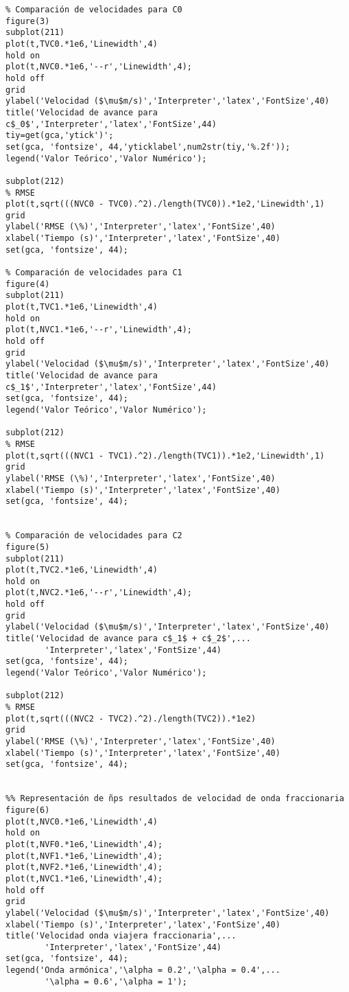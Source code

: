 \begin{lstlisting}[]
%% Representación de los resultados de velocidad
% Comparación de velocidades para C0
figure(3)
subplot(211)
plot(t,TVC0.*1e6,'Linewidth',4)
hold on
plot(t,NVC0.*1e6,'--r','Linewidth',4);
hold off
grid
ylabel('Velocidad ($\mu$m/s)','Interpreter','latex','FontSize',40)
title('Velocidad de avance para c$_0$','Interpreter','latex','FontSize',44)
tiy=get(gca,'ytick')';
set(gca, 'fontsize', 44,'yticklabel',num2str(tiy,'%.2f'));
legend('Valor Teórico','Valor Numérico');

subplot(212)
% RMSE
plot(t,sqrt(((NVC0 - TVC0).^2)./length(TVC0)).*1e2,'Linewidth',1)
grid
ylabel('RMSE (\%)','Interpreter','latex','FontSize',40)
xlabel('Tiempo (s)','Interpreter','latex','FontSize',40)
set(gca, 'fontsize', 44);

% Comparación de velocidades para C1
figure(4)
subplot(211)
plot(t,TVC1.*1e6,'Linewidth',4)
hold on
plot(t,NVC1.*1e6,'--r','Linewidth',4);
hold off
grid
ylabel('Velocidad ($\mu$m/s)','Interpreter','latex','FontSize',40)
title('Velocidad de avance para c$_1$','Interpreter','latex','FontSize',44)
set(gca, 'fontsize', 44);
legend('Valor Teórico','Valor Numérico');

subplot(212)
% RMSE
plot(t,sqrt(((NVC1 - TVC1).^2)./length(TVC1)).*1e2,'Linewidth',1)
grid
ylabel('RMSE (\%)','Interpreter','latex','FontSize',40)
xlabel('Tiempo (s)','Interpreter','latex','FontSize',40)
set(gca, 'fontsize', 44);


% Comparación de velocidades para C2
figure(5)
subplot(211)
plot(t,TVC2.*1e6,'Linewidth',4)
hold on
plot(t,NVC2.*1e6,'--r','Linewidth',4);
hold off
grid
ylabel('Velocidad ($\mu$m/s)','Interpreter','latex','FontSize',40)
title('Velocidad de avance para c$_1$ + c$_2$',...
        'Interpreter','latex','FontSize',44)
set(gca, 'fontsize', 44);
legend('Valor Teórico','Valor Numérico');

subplot(212)
% RMSE
plot(t,sqrt(((NVC2 - TVC2).^2)./length(TVC2)).*1e2)
grid
ylabel('RMSE (\%)','Interpreter','latex','FontSize',40)
xlabel('Tiempo (s)','Interpreter','latex','FontSize',40)
set(gca, 'fontsize', 44);


%% Representación de ñps resultados de velocidad de onda fraccionaria
figure(6)
plot(t,NVC0.*1e6,'Linewidth',4)
hold on
plot(t,NVF0.*1e6,'Linewidth',4);
plot(t,NVF1.*1e6,'Linewidth',4);
plot(t,NVF2.*1e6,'Linewidth',4);
plot(t,NVC1.*1e6,'Linewidth',4);
hold off
grid
ylabel('Velocidad ($\mu$m/s)','Interpreter','latex','FontSize',40)
xlabel('Tiempo (s)','Interpreter','latex','FontSize',40)
title('Velocidad onda viajera fraccionaria',...
        'Interpreter','latex','FontSize',44)
set(gca, 'fontsize', 44);
legend('Onda armónica','\alpha = 0.2','\alpha = 0.4',...
        '\alpha = 0.6','\alpha = 1');
\end{lstlisting}
